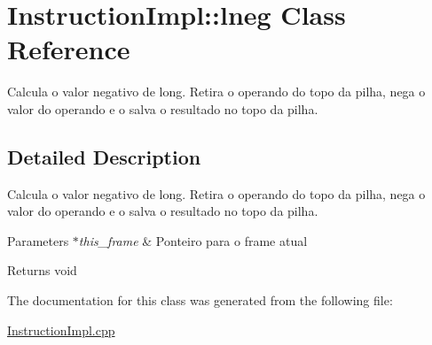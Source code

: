 \hypertarget{class_instruction_impl_1_1lneg}{}\section{Instruction\+Impl\+:\+:lneg Class Reference}
\label{class_instruction_impl_1_1lneg}


Calcula o valor negativo de long. Retira o operando do topo da pilha, nega o valor do operando e o salva o resultado no topo da pilha.  




\subsection{Detailed Description}
Calcula o valor negativo de long. Retira o operando do topo da pilha, nega o valor do operando e o salva o resultado no topo da pilha. 


\begin{DoxyParams}{Parameters}
{\em $\ast$this\+\_\+frame} & Ponteiro para o frame atual \\
\hline
\end{DoxyParams}
\begin{DoxyReturn}{Returns}
void 
\end{DoxyReturn}


The documentation for this class was generated from the following file\+:\begin{DoxyCompactItemize}
\item 
\hyperlink{_instruction_impl_8cpp}{Instruction\+Impl.\+cpp}\end{DoxyCompactItemize}
